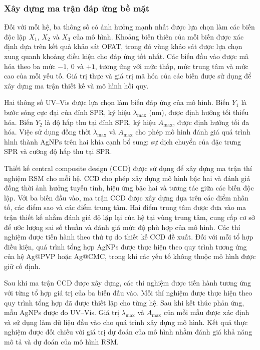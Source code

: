 \subsubsection{Xây dựng ma trận đáp ứng bề mặt}
Đối với mỗi hệ, ba thông số có ảnh hưởng mạnh nhất được lựa chọn làm các biến độc lập $X_1$, $X_2$ và $X_3$ của mô hình.
Khoảng biến thiên của mỗi biến được xác định dựa trên kết quả khảo sát OFAT, trong đó vùng khảo sát được lựa chọn xung quanh khoảng điều kiện cho đáp ứng tốt nhất.
Các biến đầu vào được mã hóa theo ba mức $-1$, $0$ và $+1$, tương ứng với mức thấp, mức trung tâm và mức cao của mỗi yếu tố.
Giá trị thực và giá trị mã hóa của các biến được sử dụng để xây dựng ma trận thiết kế và mô hình hồi quy.
\par
Hai thông số UV--Vis được lựa chọn làm biến đáp ứng của mô hình.
Biến $Y_1$ là bước sóng cực đại của đỉnh SPR, ký hiệu $\lambda_{\max}$ (nm), được định hướng tối thiểu hóa.
Biến $Y_2$ là độ hấp thu tại đỉnh SPR, ký hiệu $A_{\max}$, được định hướng tối đa hóa.
Việc sử dụng đồng thời $\lambda_{\max}$ và $A_{\max}$ cho phép mô hình đánh giá quá trình hình thành AgNPs trên hai khía cạnh bổ sung: sự dịch chuyển của đặc trưng SPR và cường độ hấp thu tại SPR.

Thiết kế central composite design (CCD) được sử dụng để xây dựng ma trận thí nghiệm RSM cho mỗi hệ.
CCD cho phép xây dựng mô hình bậc hai và đánh giá đồng thời ảnh hưởng tuyến tính, hiệu ứng bậc hai và tương tác giữa các biến độc lập.
Với ba biến đầu vào, ma trận CCD được xây dựng dựa trên các điểm nhân tố, các điểm sao và các điểm trung tâm.
Hai điểm trung tâm được đưa vào ma trận thiết kế nhằm đánh giá độ lặp lại của hệ tại vùng trung tâm, cung cấp cơ sở để ước lượng sai số thuần và đánh giá mức độ phù hợp của mô hình.
Các thí nghiệm được tiến hành theo thứ tự do thiết kế CCD đề xuất.
Đối với mỗi tổ hợp điều kiện, quá trình tổng hợp AgNPs được thực hiện theo quy trình tương ứng của hệ Ag@PVP hoặc Ag@CMC, trong khi các yếu tố không thuộc mô hình được giữ cố định.

Sau khi ma trận CCD được xây dựng, các thí nghiệm được tiến hành tương ứng với từng tổ hợp giá trị của ba biến đầu vào.
Mỗi thí nghiệm được thực hiện theo quy trình tổng hợp đã được thiết lập cho từng hệ.
Sau khi kết thúc phản ứng, mẫu AgNPs được đo UV--Vis. 
Giá trị $\lambda_{\max}$ và $A_{\max}$ của mỗi mẫu được xác định và sử dụng làm dữ liệu đầu vào cho quá trình xây dựng mô hình.
Kết quả thực nghiệm được đối chiếu với giá trị dự đoán của mô hình nhằm đánh giá khả năng mô tả và dự đoán của mô hình RSM.

